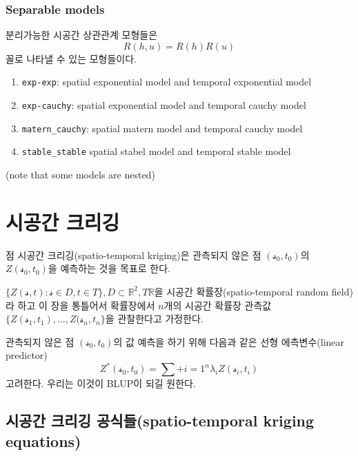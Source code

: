\documentclass[b5paper,]{scrbook}
\theoremstyle{plain}
\theoremstyle{definition}
\numberwithin{equation}{section}
\begin{document}
\hypertarget{separable-models}{%
\subsection{Separable models}\label{separable-models}}

분리가능한 시공간 상관관계 모형들은
\[R(h,u)=R(h)R(u)\]
꼴로 나타낼 수 있는 모형들이다.

\begin{enumerate}
\def\labelenumi{\arabic{enumi}.}
\item
  \texttt{exp-exp}: spatial exponential model and temporal exponential model
\item
  \texttt{exp-cauchy}: spatial exponential model and temporal cauchy model
\item
  \texttt{matern\_cauchy}: spatial matern model and temporal cauchy model
\item
  \texttt{stable\_stable} spatial stabel model and temporal stable model
\end{enumerate}

(note that some models are nested)

\hypertarget{stkriging}{%
\chapter{시공간 크리깅}\label{stkriging}}

점 시공간 크리깅(spatio-temporal kriging)은 관측되지 않은 점 \((\mathcal{s}_{0},t_{0})\)의 \(Z(\mathcal{s}_{0},t_{0})\)을 예측하는 것을 목표로 한다.

\(\{ Z(\mathcal{s}, t): \mathcal{s}\in D, t\in T\}, D \subset \mathbb{R}^{2}, T\mathbb{R}\)을 시공간 확률장(spatio-temporal random field)라 하고 이 장을 통틀어서 확률장에서 \(n\)개의 시공간 확률장 관측값 \(\{ Z(\mathcal{s}_{1}, t_{1}), \ldots , Z(\mathcal{s}_{n}, t_{n}\}\)을 관찰한다고 가정한다.

관측되지 않은 점 \((\mathcal{s}_{0},t_{0})\)의 값 예측을 하기 위해 다음과 같은 선형 에측변수(linear predictor)
\[Z^{*}(\mathcal{s}_{0},t_{0})=\sum+{i=1}^{n}\lambda_{i}Z(\mathcal{s}_{i}, t_{i})\]
고려한다. 우리는 이것이 BLUP이 되길 원한다.

\hypertarget{--spatio-temporal-kriging-equations}{%
\section{시공간 크리깅 공식들(spatio-temporal kriging equations)}\label{--spatio-temporal-kriging-equations}}
\end{document}
